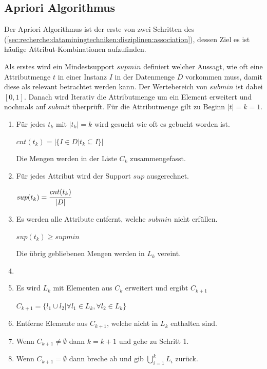 \subsection{Apriori Algorithmus}
Der Apriori Algorithmus ist der erste von zwei Schritten des  (\cref{sec:recherche:dataminingtechniken:disziplinen:association}), dessen Ziel es ist häufige Attribut-Kombinationen aufzufinden. 

Als erstes wird ein Mindestsupport $supmin$ definiert welcher Aussagt, wie oft eine Attributmenge $t$ in einer Instanz $I$ in der Datenmenge $D$ vorkommen muss, damit diese als relevant betrachtet werden kann. Der Wertebereich von $submin$ ist dabei $[0,1]$. Danach wird Iterativ die Attributmenge um ein Element erweitert und nochmals auf $submit$ überprüft. Für die Attributmenge gilt zu Beginn $|t| = k = 1$.
\begin{enumerate}
\item Für jedes $t_k$ mit $|t_k| = k$ wird gesucht wie oft es gebucht worden ist.
	\begin{center}
	$cnt(t_k) = \big|\{I \in D | t_k \subseteq I \}\big|$
	\end{center}
	Die Mengen werden in der Liste $C_k$ zusammengefasst.
\item Für jedes Attribut wird der Support $sup$ ausgerechnet.
	\begin{center}
	$sup(t_k) = \cfrac{cnt(t_k)}{|D|}$
	\end{center}
\item Es werden alle Attribute entfernt, welche $submin$ nicht erfüllen.
	\begin{center}
	$sup(t_k) \ge supmin$
	\end{center}
	Die übrig gebliebenen Mengen werden in $L_k$ vereint.
\item {}
\item Es wird $L_k$ mit Elementen aus $C_k$ erweitert und ergibt $C_{k+1}$
	\begin{center}
	$ C_{k+1} = \{l_1 \cup l_2 | \forall l_1 \in L_k, \forall l_2 \in L_k \} $
	\end{center}
\item Entferne Elemente aus $C_{k+1}$, welche nicht in $L_k$ enthalten sind.
\item Wenn $C_{k+1} \neq \emptyset$ dann $k = k+1$ und gehe zu Schritt 1. 
\item Wenn $C_{k+1} = \emptyset$ dann breche ab und gib $\bigcup\limits_{i=1}^{k} L_{i}$ zurück.
\end{enumerate}

